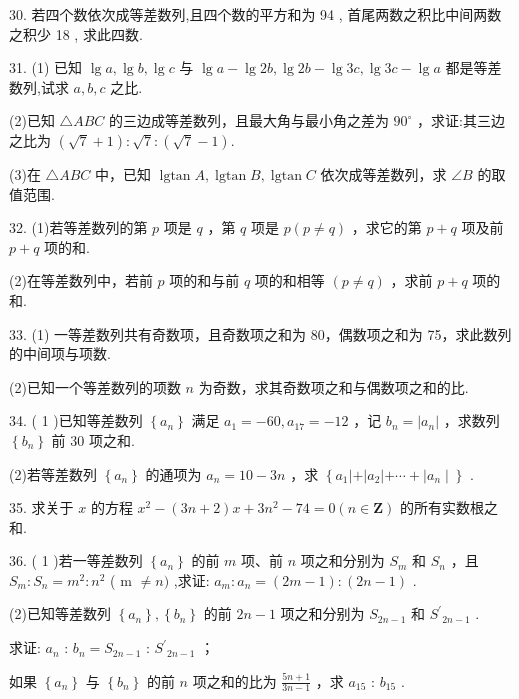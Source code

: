 \documentclass[10pt]{article}
\newcommand*\circled[1]{\tikz[baseline=(char.base)]{\node[shape=circle,draw,inner sep=1.5pt] (char) {\small #1};}}
\begin{document}
30. 若四个数依次成等差数列,且四个数的平方和为 94 , 首尾两数之积比中间两数之积少 18 , 求此四数.

31. (1) 已知 \(\lg a,\lg b,\lg c\) 与 \(\lg a - \lg {2b},\lg {2b} - \lg {3c},\lg {3c} - \lg a\) 都是等差数列,试求 \(a,b,c\) 之比.

(2)已知 \(\bigtriangleup  {ABC}\) 的三边成等差数列，且最大角与最小角之差为 \({90}^{ \circ  }\) ，求证:其三边之比为 \(\left( {\sqrt{7} + 1}\right)  : \sqrt{7} : \left( {\sqrt{7} - 1}\right) .\)

(3)在 \(\bigtriangleup  {ABC}\) 中，已知 \(\operatorname{lgtan}A,\operatorname{lgtan}B,\operatorname{lgtan}C\) 依次成等差数列，求 \(\angle B\) 的取值范围.

32. (1)若等差数列的第 \(p\) 项是 \(q\) ，第 \(q\) 项是 \(p\left( {p \neq  q}\right)\) ，求它的第 \(p + q\) 项及前 \(p + q\) 项的和.

(2)在等差数列中，若前 \(p\) 项的和与前 \(q\) 项的和相等 \(\left( {p \neq  q}\right)\) ，求前 \(p + q\) 项的和.

33. (1) 一等差数列共有奇数项，且奇数项之和为 80，偶数项之和为 75，求此数列的中间项与项数.

(2)已知一个等差数列的项数 \(n\) 为奇数，求其奇数项之和与偶数项之和的比.

34. ( 1 )已知等差数列 \(\left\{  {a}_{n}\right\}\) 满足 \({a}_{1} =  - {60},{a}_{17} =  - {12}\) ，记 \({b}_{n} = \left| {a}_{n}\right|\) ，求数列 \(\left\{  {b}_{n}\right\}\) 前 30 项之和.

(2)若等差数列 \(\left\{  {a}_{n}\right\}\) 的通项为 \({a}_{n} = {10} - {3n}\) ，求 \(\left\{  {{a}_{1}\left| +\right| {a}_{2}\left| {+\cdots  + }\right| {a}_{n} \mid  }\right\}\) .

35. 求关于 \(x\) 的方程 \({x}^{2} - \left( {{3n} + 2}\right) x + 3{n}^{2} - {74} = 0\left( {n \in  \mathbf{Z}}\right)\) 的所有实数根之和.

36. ( 1 )若一等差数列 \(\left\{  {a}_{n}\right\}\) 的前 \(m\) 项、前 \(n\) 项之和分别为 \({S}_{m}\) 和 \({S}_{n}\) ，且 \({S}_{m} : {S}_{n} = {m}^{2} : {n}^{2}\) ( m \(\neq  n)\) ,求证: \({a}_{m} : {a}_{n} = \left( {{2m} - 1}\right)  : \left( {{2n} - 1}\right)\) .

(2)已知等差数列 \(\left\{  {a}_{n}\right\}  ,\left\{  {b}_{n}\right\}\) 的前 \({2n} - 1\) 项之和分别为 \({S}_{{2n} - 1}\) 和 \({{S}^{\prime }}_{{2n} - 1}\) .

 \circled{1}  求证: \({a}_{n}\) : \({b}_{n} = {S}_{{2n} - 1}\) : \({S}^{\prime }{}_{{2n} - 1}\) ；

 \circled{2} 如果 \(\left\{  {a}_{n}\right\}\) 与 \(\left\{  {b}_{n}\right\}\) 的前 \(n\) 项之和的比为 \(\frac{{5n} + 1}{{3n} - 1}\) ，求 \({a}_{15}\) : \({b}_{15}\) .
\end{document}
